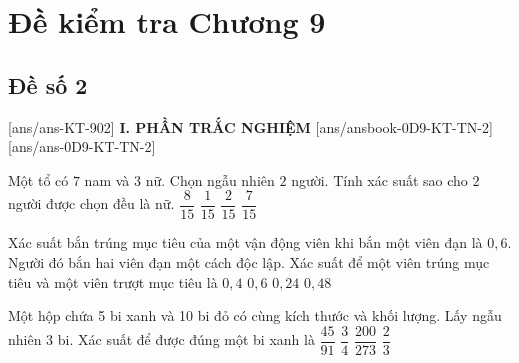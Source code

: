 \section*{Đề kiểm tra Chương 9}
\subsection*{Đề số 2}
\setcounter{ex}{0}\setcounter{bt}{0}
[ans/ans-KT-902]
\noindent\textbf{I. PHẦN TRẮC NGHIỆM}
[ans/ansbook-0D9-KT-TN-2]
[ans/ans-0D9-KT-TN-2]
\begin{ex}%
	Một tổ có $7$ nam và $3$ nữ. Chọn ngẫu nhiên $2$ người. Tính xác suất sao cho $2$ người được chọn đều là nữ.
	\choice
	{$\dfrac{8}{15}$}
	{\True $\dfrac{1}{15}$}
	{$\dfrac{2}{15}$}
	{$\dfrac{7}{15}$}
\end{ex}


\begin{ex}%
	Xác suất bắn trúng mục tiêu của một vận động viên khi bắn một viên đạn là $0{,}6$. Người đó bắn hai viên đạn một cách độc lập. Xác suất để một viên trúng mục tiêu và một viên trượt mục tiêu là
	\choice
	{$0{,}4$}
	{$0{,}6$}
	{$0{,}24$}
	{\True $0{,}48$}
\end{ex}


\begin{ex}%
	Một hộp chứa 5 bi xanh và 10 bi đỏ có cùng kích thước và khối lượng. Lấy ngẫu nhiên 3 bi. Xác suất để được đúng một bi xanh là
	\choice
	{\True $\dfrac{45}{91}$}
	{$\dfrac{3}{4}$}
	{$\dfrac{200}{273}$}
	{$\dfrac{2}{3}$}
\end{ex}


